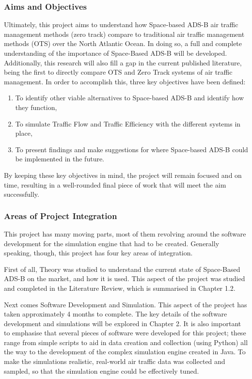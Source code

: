 \documentclass[stu, a4paper, 12pt, floatsintext]{apa7}
\numberwithin{figure}{section}
\numberwithin{table}{section}
\numberwithin{equation}{section}
\begin{document}
\subsubsection{Aims and Objectives}
Ultimately, this project aims to understand how Space-based ADS-B air traffic management methods (zero track) compare to traditional air traffic management methods (OTS) over the North Atlantic Ocean. In doing so, a full and complete understanding of the importance of Space-Based ADS-B will be developed. Additionally, this research will also fill a gap in the current published literature, being the first to directly compare OTS and Zero Track systems of air traffic management. In order to accomplish this, three key objectives have been defined:
\begin{enumerate}
    \item To identify other viable alternatives to Space-based ADS-B and identify how they function,
    \item To simulate Traffic Flow and Traffic Efficiency with the different systems in place,
    \item To present findings and make suggestions for where Space-based ADS-B could be implemented in the future.
\end{enumerate}
By keeping these key objectives in mind, the project will remain focused and on time, resulting in a well-rounded final piece of work that will meet the aim successfully. 
\subsubsection{Areas of Project Integration}
This project has many moving parts, most of them revolving around the software development for the simulation engine that had to be created. Generally speaking, though, this project has four key areas of integration. 

First of all, Theory was studied to understand the current state of Space-Based ADS-B on the market, and how it is used. This aspect of the project was studied and completed in the Literature Review, which is summarised in Chapter 1.2. 

Next comes Software Development and Simulation. This aspect of the project has taken approximately 4 months to complete. The key details of the software development and simulations will be explored in Chapter 2. It is also important to emphasise that several pieces of software were developed for this project; these range from simple scripts to aid in data creation and collection (using Python) all the way to the development of the complex simulation engine created in Java. To make the simulations realistic, real-world air traffic data was collected and sampled, so that the simulation engine could be effectively tuned. 
\end{document}
